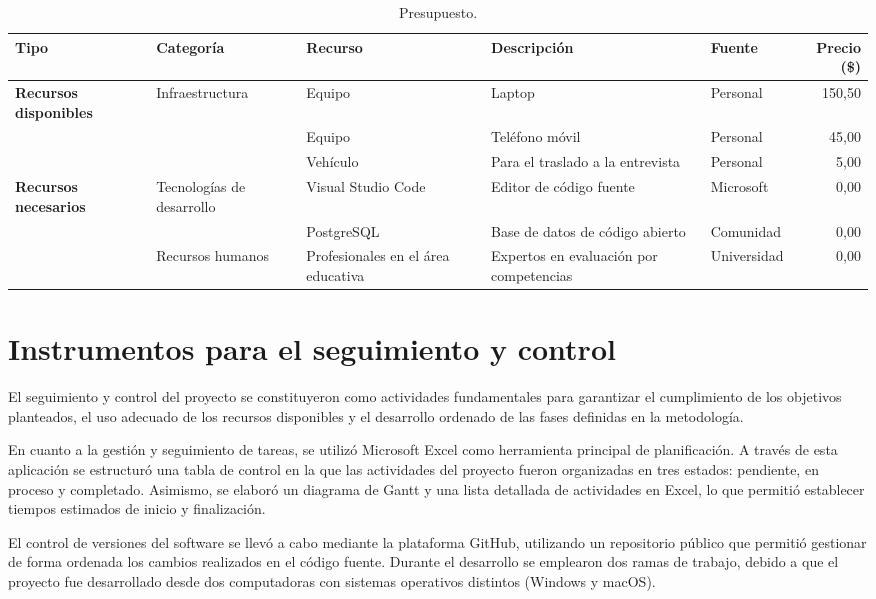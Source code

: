 \begin{table}[H]
\centering
\caption{Presupuesto.}
\label{tab:presupuesto}
\footnotesize
\renewcommand{\arraystretch}{1.2}
\begin{tabularx}{\textwidth}{|>{\bfseries}p{2.6cm}|p{2.6cm}|p{2.4cm}|X|p{1.7cm}|r|}
\hline
\rowcolor{headblue}
Tipo & Categoría & Recurso & Descripción & Fuente & Precio (\$)\\\hline
Recursos disponibles & Infraestructura & Equipo & Laptop & Personal & 150{,}50 \\\hline
                     &                 & Equipo & Teléfono móvil & Personal & 45{,}00 \\\hline
                     &                 & Vehículo & Para el traslado a la entrevista & Personal & 5{,}00 \\\hline
Recursos necesarios & Tecnologías de desarrollo & Visual Studio Code & Editor de código fuente & Microsoft & 0{,}00 \\\hline
                    &                          & PostgreSQL & Base de datos de código abierto & Comunidad & 0{,}00 \\\hline
                    & Recursos humanos & Profesionales en el área educativa & Expertos en evaluación por competencias & Universidad & 0{,}00 \\\hline
\end{tabularx}
\end{table}
\elaboracion

\section{Instrumentos para el seguimiento y control}

El seguimiento y control del proyecto se constituyeron como actividades fundamentales para garantizar el cumplimiento de los objetivos planteados, el uso adecuado de los recursos disponibles y el desarrollo ordenado de las fases definidas en la metodología.

En cuanto a la gestión y seguimiento de tareas, se utilizó Microsoft Excel como herramienta principal de planificación. A través de esta aplicación se estructuró una tabla de control en la que las actividades del proyecto fueron organizadas en tres estados: pendiente, en proceso y completado. Asimismo, se elaboró un diagrama de Gantt y una lista detallada de actividades en Excel, lo que permitió establecer tiempos estimados de inicio y finalización.

El control de versiones del software se llevó a cabo mediante la plataforma GitHub, utilizando un repositorio público que permitió gestionar de forma ordenada los cambios realizados en el código fuente. Durante el desarrollo se emplearon dos ramas de trabajo, debido a que el proyecto fue desarrollado desde dos computadoras con sistemas operativos distintos (Windows y macOS).

